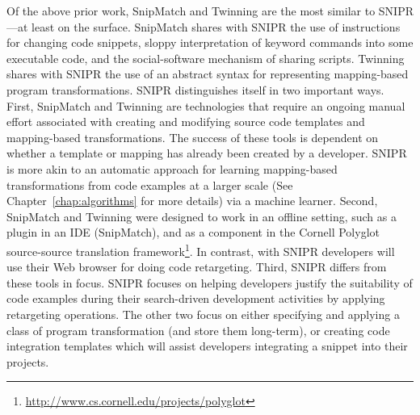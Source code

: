 Of the above prior work, SnipMatch and Twinning are the most similar to \uppercase{SnipR}---at least on the surface. SnipMatch shares with \uppercase{SnipR} the use of instructions for changing code snippets, sloppy interpretation of keyword commands into some executable code, and the social-software mechanism of sharing scripts. Twinning shares with \uppercase{SnipR} the use of an abstract syntax for representing mapping-based program transformations. \uppercase{SnipR} distinguishes itself in two important ways. First, SnipMatch and Twinning are technologies that require an ongoing manual effort associated with creating and modifying source code templates and mapping-based transformations. The success of these tools is dependent on whether a template or mapping has already been created by a developer. \uppercase{SnipR} is more akin to an automatic approach for learning mapping-based transformations from code examples at a larger scale (See Chapter~\ref{chap:algorithms} for more details) via a machine learner. Second, SnipMatch and Twinning were designed to work in an offline setting, such as a plugin in an IDE (SnipMatch), and as a component in the Cornell Polyglot source-source translation framework\footnote{\url{http://www.cs.cornell.edu/projects/polyglot}}. In contrast, with \uppercase{SnipR} developers will use their Web browser for doing code retargeting. Third, \uppercase{SnipR} differs from these tools in focus. \uppercase{SnipR} focuses on helping developers justify the suitability of code examples during their search-driven development activities by applying retargeting operations. The other two focus on either specifying and applying a class of program transformation (and store them long-term), or creating code integration templates which will assist developers integrating a snippet into their projects.  
